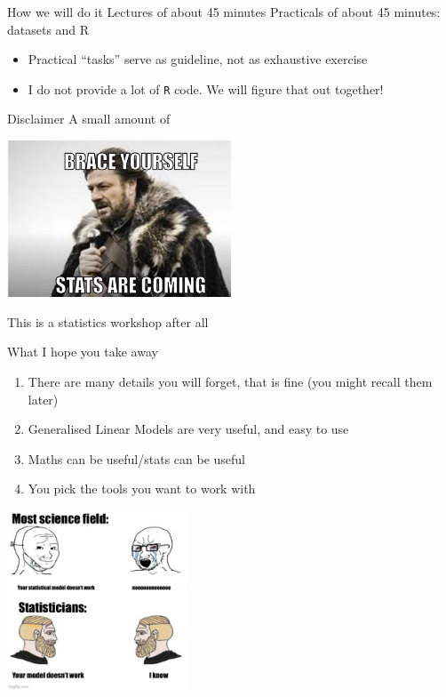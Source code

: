 \documentclass[
  ignorenonframetext,
]{beamer}
\providecommand{\tightlist}{%
  \setlength{\itemsep}{0pt}\setlength{\parskip}{0pt}}
\begin{document}
\begin{frame}{How we will do it}
\protect\hypertarget{how-we-will-do-it}{}
Lectures of about 45 minutes \newline Practicals of about 45 minutes:
datasets and R

\begin{itemize}
\tightlist
\item
  Practical ``tasks'' serve as guideline, not as exhaustive exercise
\item
  I do not provide a lot of \texttt{R} code. We will figure that out
  together!
\end{itemize}
\end{frame}

\begin{frame}{Disclaimer}
\protect\hypertarget{disclaimer}{}
A \tiny small \normalsize amount of \tiny \color{red}{maths}

\includegraphics[width=0.5\textwidth,height=\textheight]{stats.jpeg}

\vfill

\hfill  This is a statistics workshop after all \normalsize
\end{frame}

\begin{frame}{What I hope you take away}
\protect\hypertarget{what-i-hope-you-take-away}{}
\begin{enumerate}
\tightlist
\item
  There are many details you will forget, that is fine (you might recall
  them later)
\item
  Generalised Linear Models are very useful, and easy to use
\item
  Maths can be useful/stats can be useful
\item
  You pick the tools you want to work with
\end{enumerate}

\center

\includegraphics[width=0.4\textwidth,height=\textheight]{model.png}
\end{frame}
\end{document}
